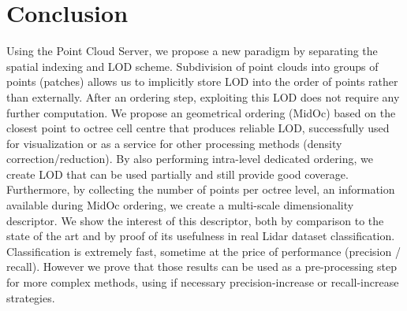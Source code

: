 

\section{Conclusion} 
	Using the Point Cloud Server, we propose a new paradigm by separating the spatial indexing and LOD scheme. Subdivision of point clouds into groups of points (patches) allows us to implicitly store LOD into the order of points rather than externally. 
	After an ordering step, exploiting this LOD does not require any further computation. 
	We propose an geometrical ordering (MidOc) based on the closest point to octree cell centre that produces reliable LOD, successfully used for visualization or as a service for other processing methods (density correction/reduction).
	By also performing intra-level dedicated ordering, we create LOD that can be used partially and still provide good coverage.
	Furthermore, by collecting the number of points per octree level, an information available during MidOc ordering, we create a multi-scale dimensionality descriptor.
	We show the interest of this descriptor, both by comparison to the state of the art and by proof of its usefulness in real Lidar dataset classification.
	Classification is extremely fast, sometime at the price of performance (precision / recall). 
	However we prove that those results can be used as a pre-processing step for more complex methods, using if necessary precision-increase or recall-increase strategies. 
	
	 